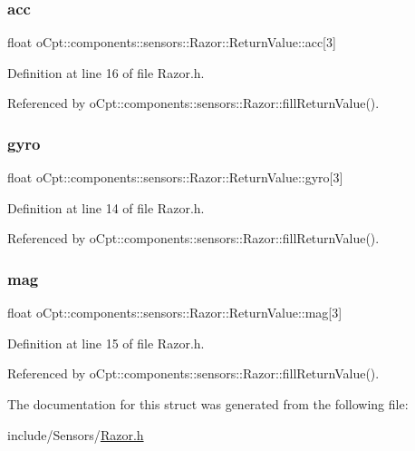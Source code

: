 \subsubsection{\texorpdfstring{acc}{acc}}
{\footnotesize\ttfamily float o\+Cpt\+::components\+::sensors\+::\+Razor\+::\+Return\+Value\+::acc\mbox{[}3\mbox{]}}



Definition at line 16 of file Razor.\+h.



Referenced by o\+Cpt\+::components\+::sensors\+::\+Razor\+::fill\+Return\+Value().

\hypertarget{structo_cpt_1_1components_1_1sensors_1_1_razor_1_1_return_value_a4657a274087fb9d95dcfb6a3e9903a44}{}\label{structo_cpt_1_1components_1_1sensors_1_1_razor_1_1_return_value_a4657a274087fb9d95dcfb6a3e9903a44} 
\subsubsection{\texorpdfstring{gyro}{gyro}}
{\footnotesize\ttfamily float o\+Cpt\+::components\+::sensors\+::\+Razor\+::\+Return\+Value\+::gyro\mbox{[}3\mbox{]}}



Definition at line 14 of file Razor.\+h.



Referenced by o\+Cpt\+::components\+::sensors\+::\+Razor\+::fill\+Return\+Value().

\hypertarget{structo_cpt_1_1components_1_1sensors_1_1_razor_1_1_return_value_ad8bcb98a9cb77104c53f11cd2fdd1d11}{}\label{structo_cpt_1_1components_1_1sensors_1_1_razor_1_1_return_value_ad8bcb98a9cb77104c53f11cd2fdd1d11} 
\subsubsection{\texorpdfstring{mag}{mag}}
{\footnotesize\ttfamily float o\+Cpt\+::components\+::sensors\+::\+Razor\+::\+Return\+Value\+::mag\mbox{[}3\mbox{]}}



Definition at line 15 of file Razor.\+h.



Referenced by o\+Cpt\+::components\+::sensors\+::\+Razor\+::fill\+Return\+Value().



The documentation for this struct was generated from the following file\+:\begin{DoxyCompactItemize}
\item 
include/\+Sensors/\hyperlink{_razor_8h}{Razor.\+h}\end{DoxyCompactItemize}
